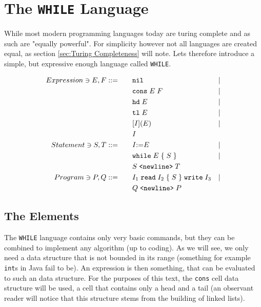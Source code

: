 \section{The {\tt WHILE} Language}
\label{sec:WHILE}
While most modern programming languages today are turing complete and as such
are "equally powerful". For simplicity however not all languages are created
equal, as section \ref{sec:Turing Completeness} will note. Lets therefore
introduce a simple, but expressive enough language called {\tt WHILE}.

\begin{table}[h]
	\begin{align*}
		Expression \ni E, F::= \qquad
										& \mathtt{nil} & | \\
										& \mathtt{cons}\; E\; F & | \\
										& \mathtt{hd}\; E     & | \\
										& \mathtt{tl}\; E     & | \\
										& \mathtt{[}I \mathtt{](} E \mathtt{)}      & | \\
										& I \\
		Statement \ni S, T::= \qquad
										& I \mathtt{:=} E & | \\
										& \mathtt{while}\; E\; \mathtt{\{}\; S\; \mathtt{\}} & | \\
										& S \; \text{\tt{<newline>}}\; T \\
		Program \ni P, Q::= \qquad
										& I_1\; \mathtt{read}\; I_2\; \mathtt{\{}\; S\; \mathtt{\}}\; \mathtt{write}\; I_3 & | \\
										& Q  \; \text{\tt{<newline>}}\; P
	\end{align*}
\end{table}

\subsection{The Elements} %
\label{sub:The Elements}
The {\tt WHILE} language contains only very basic commands, but they can be combined
to implement any algorithm (up to coding). As we will see, we only need a data
structure that is not bounded in its range (something for example {\tt int}s in
Java fail to be). An expression is then something, that can be evaluated to
such an data structure. For the purposes of this text, the {\tt cons} cell data
structure will be used, a cell that contains only a head and a tail (an
observant reader will notice that this structure stems from the building of
linked lists). 

